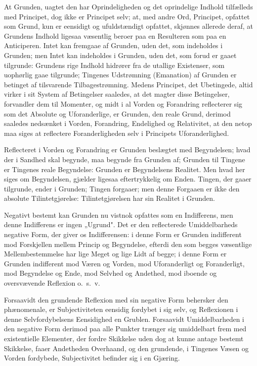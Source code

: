 \documentclass[12pt]{book}
\newcommand{\opage}[1]{\marginnote{\footnotesize\textit{[#1]}}}
\begin{document}
At Grunden, uagtet den har Oprindeligheden og det oprindelige Indhold tilfælleds med
Principet, dog ikke er Principet selv; at, med andre Ord, Principet, opfattet som
Grund, kun er eensidigt og ufuldstændigt opfattet, skjønnes allerede deraf, at
Grundens Indhold ligesaa væsentlig beroer paa en Resulteren som paa en Anticiperen.
Intet kan fremgaae af Grunden, uden det, som indeholdes i Grunden; men Intet kan
indeholdes i Grunden, uden det, som forud er gaaet tilgrunde: Grundens rige Indhold
hidrører fra de utallige Existenser, som uophørlig gaae tilgrunde; Tingenes
Udstrømning (Emanation) af Grunden er betinget af tilsvarende Tilbagestrømning. Medens
Principet, det Ubetingede, altid virker i sit System af Betingelser saaledes, at det
magter disse Betingelser, forvandler dem til Momenter, og midt i al Vorden og
Forandring reflecterer sig som det Absolute og Uforanderlige, er Grunden, den reale
Grund, derimod saaledes nedsænket i Vorden, Forandring, Endelighed og Relativitet, at
den netop maa siges at reflectere Foranderligheden selv i Principets Uforanderlighed.

Reflecteret i Vorden og Forandring er Grunden beslægtet med Begyndelsen; hvad der i
Sandhed skal begynde, maa begynde fra Grunden af; Grunden til Tingene er Tingenes
reale Begyndelse: Grunden er Begyndelsens Realitet. Men hvad her siges om
Begyndelsen, gjælder ligesaa eftertrykkelig om Enden. Tingen, der gaaer tilgrunde,
ender i Grunden; Tingen forgaaer; men denne Forgaaen er ikke den absolute
Tilintetgjørelse: Tilintetgjørelsen har sin Realitet i Grunden.

\opage{92} Negativt bestemt kan Grunden nu vistnok opfattes som en Indifferens, men denne
Indifferens er ingen „Ugrund". Det er den reflecterede Umiddelbarheds negative Form,
der giver os Indifferensen: i denne Form er Grunden indifferent mod Forskjellen
mellem Princip og Begyndelse, efterdi den som begges væsentlige Mellembestemmelse har
lige Meget og lige Lidt af begge; i denne Form er Grunden indifferent mod Væren og
Vorden, mod Uforanderligt og Foranderligt, mod Begyndelse og Ende, mod Selvhed og
Andethed, mod iboende og oversvævende Reflexion o.\ s.\ v.

Forsaavidt den grundende Reflexion med sin negative Form behersker den phænomenale,
er Subjectiviteten eensidig fordybet i sig selv, og Reflexionen i denne
Selvfordybelsens Eensidighed en Grublen. Forsaavidt Umiddelbarheden i den negative
Form derimod paa alle Punkter trænger sig umiddelbart frem med existentielle
Elementer, der fordre Skikkelse uden dog at kunne antage bestemt Skikkelse, faaer
Andetheden Overhaand, og den grundende, i Tingenes Væsen og Vorden fordybede,
Subjectivitet befinder sig i en Gjæring.
\end{document}
